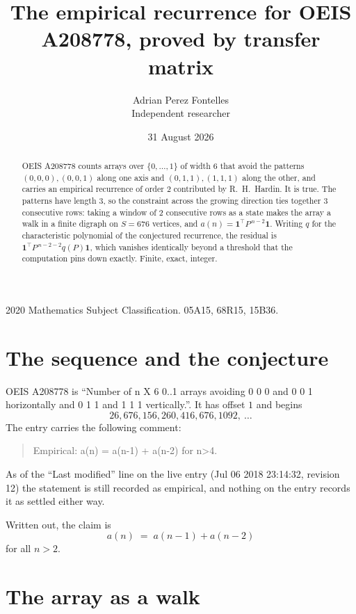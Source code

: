 \documentclass[11pt,a4paper]{article}
\title{The empirical recurrence for OEIS A208778, proved by transfer matrix}
\author{Adrian Perez Fontelles\\ \small Independent researcher}
\date{31 August 2026}
\theoremstyle{plain}
\theoremstyle{definition}
\begin{document}
\maketitle

\begin{abstract}
OEIS A208778 counts arrays over $\{0,\dots,1\}$ of width $6$ that avoid the patterns
$(0,0,0), (0,0,1)$ along one axis and $(0,1,1), (1,1,1)$ along the other, and carries an empirical recurrence of
order $2$ contributed by R.~H.~Hardin. It is true. The patterns have length $3$, so
the constraint across the growing direction ties together $3$ consecutive rows: taking a
window of $2$ consecutive rows as a state makes the array a walk in a finite digraph
on $S=676$ vertices, and $a(n)=\mathbf{1}^{\!\top}P^{\,n-2}\mathbf{1}$. Writing $q$
for the characteristic polynomial of the conjectured recurrence, the residual is
$\mathbf{1}^{\!\top}P^{\,n-2-2}q(P)\mathbf{1}$, which vanishes identically
beyond a threshold that the computation pins down exactly. Finite, exact, integer.
\end{abstract}

\noindent\small 2020 Mathematics Subject Classification. 05A15, 68R15, 15B36.\normalsize

\section{The sequence and the conjecture}

OEIS A208778 is ``Number of n X 6 0..1 arrays avoiding 0 0 0 and 0 0 1 horizontally and 0 1 1 and 1 1 1 vertically.''. It has offset
$1$ and begins
\[
26, 676, 156, 260, 416, 676, 1092,\ \dots
\]
The entry carries the following comment:
\begin{quote}\small
Empirical: a(n) = a(n-1) + a(n-2) for n>4.
\end{quote}
As of the ``Last modified'' line on the live entry (Jul 06 2018 23:14:32, revision
12) the statement is still recorded as empirical, and nothing on the entry
records it as settled either way.

Written out, the claim is
\begin{equation}\label{eq:conj}
a(n)\;=\;a(n-1) + a(n-2)
\end{equation}
for all $n>2$. 

\section{The array as a walk}
\end{document}
